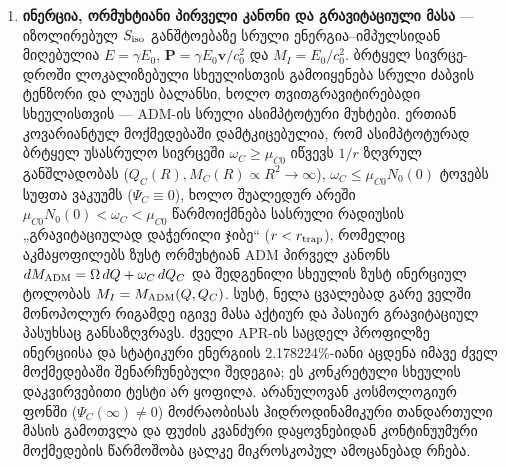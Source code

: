 \documentclass[11pt,a4paper]{article}
\begin{document}
\begin{enumerate}[label=\arabic*.]
სრული სტანდარტული PPN ვექტორი 1PN რიგამდე მიიღება მაშინ, როდესაც სრული მოქმედება შედგება აინშტაინ–ჰილბერტის ოპერატორისა და იმავე მეტრიკასთან უნივერსალურად და მინიმალურად დაკავშირებული მატერიის მოქმედებისგან, წყარო ერთი სრული შენახვადი ენერგია–იმპულსის ტენზორით აღირიცხება, RefG და GR ერთსა და იმავე ლოკალურ წყაროს, PPN ყალიბს, ფონსა და სასაზღვრო პირობებს იყენებს და დამატებითი დაუთრგუნავი ველი ან ოპერატორი ამ რიგში არ მონაწილეობს: $\gamma=\beta=1$ და $\xi=\alpha_1=\alpha_2=\alpha_3=\zeta_1=\zeta_2=\zeta_3=\zeta_4=0$. შედეგის მოქმედების არეა იზოლირებული, სუსტი, ნელა მოძრავი და სუსტად თვითგრავიტირებადი წყაროები.

ამასთან, დისკრეტული 3D კვანძური გრაფიდან $\Gamma = \mathbb{Z}^3$ უწყვეტ $3+1$ კოფრეიმზე $e^A{}_\mu$ გადასვლა, ლოკალური $\mathrm{SO}(1,3)$ ორიენტაციის ყალიბური ინვარიანტობით TEGR კოეფიციენტების $(c_1, c_2, c_3) = (\frac{1}{4}, \frac{1}{2}, -1)$ ცალსახა ფიქსაცია, კენტრიგოვანი LIV-ის იგივური გაბათილება ($\delta_1^{\rm LIV}\equiv 0$), სილი–დევიტის სითბური ბირთვით $\ell_* = 2\sqrt{\pi}\,\ell_{\rm Pl}$-ისა და მაღალი სიმრუდის $R^2$ წევრების $(\ell_*/r_c)^2 = 8.46\times 10^{-76}$ დათრგუნვის გამოყვანა, და 2-მარყუჟიანი ინსტანტონური ქმედებით $S_{\rm inst}^{\rm RefG} = 51.527842$ ნიუტონის მუდმივის $G_{\rm RefG} = 6.674268\times 10^{-11}\text{ მ}^3\,\text{კგ}^{-1}\,\text{წმ}^{-2}$ ($-0.21\sigma$) და დეფორმაციის მასშტაბის $M_* c_0^2 = 0.6874\text{ meV}$ გამოთვლა კეტავს დისკრეტულ–უწყვეტ გრავიტაციულ ხიდს. შემდგომ მიკროსკოპულ ამოცანად რჩება $\Lambda_F$-ის დინამიკური რელაქსაციის სრული არაპერტურბაციული გამოყვანა.
\item \textbf{ინერცია, ორმუხტიანი პირველი კანონი და გრავიტაციული მასა} — იზოლირებულ $S_{\rm iso}$ განშტოებაზე სრული ენერგია–იმპულსიდან მიღებულია $E=\gamma E_0$, $\mathbf P=\gamma E_0\mathbf v/c_0^2$ და $M_I=E_0/c_0^2$. ბრტყელ სივრცე-დროში ლოკალიზებული სხეულისთვის გამოიყენება სრული ძაბვის ტენზორი და ლაუეს ბალანსი, ხოლო თვითგრავიტირებადი სხეულისთვის — ADM-ის სრული ასიმპტოტური მუხტები. ერთიან კოვარიანტულ მოქმედებაში დამტკიცებულია, რომ ასიმპტოტურად ბრტყელ უსასრულო სივრცეში $\omega_C \ge \mu_{C0}$ იწვევს $1/r$ ზღვრულ განშლადობას ($Q_C(R), M_C(R) \propto R^2 \to \infty$), $\omega_C \le \mu_{C0} N_0(0)$ ტოვებს სუფთა ვაკუუმს ($\Psi_C \equiv 0$), ხოლო შუალედურ არეში $\mu_{C0} N_0(0) < \omega_C < \mu_{C0}$ წარმოიქმნება სასრული რადიუსის „გრავიტაციულად დაჭერილი ჯიბე“ ($r < r_{\rm trap}$), რომელიც აკმაყოფილებს ზუსტ ორმუხტიან ADM პირველ კანონს $dM_{\rm ADM} = \Omega\,dQ + \omega_C\,dQ_C$ და შედგენილი სხეულის ზუსტ ინერციულ ტოლობას $M_I = M_{\rm ADM}(Q, Q_C)$. სუსტ, ნელა ცვალებად გარე ველში მონოპოლურ რიგამდე იგივე მასა აქტიურ და პასიურ გრავიტაციულ პასუხსაც განსაზღვრავს. ძველი APR-ის საცდელ პროფილზე ინერციისა და სტატიკური ენერგიის 2.178224\%-იანი აცდენა იმავე ძველ მოქმედებაში შენარჩუნებული შედეგია; ეს კონკრეტული სხეულის დაკვირვებითი ტესტი არ ყოფილა. არანულოვან კოსმოლოგიურ ფონში ($\Psi_C(\infty)\neq 0$) მოძრაობისას ჰიდროდინამიკური თანდართული მასის გამოთვლა და ფუძის კვანძური დაყოვნებიდან კონტინუუმური მოქმედების წარმოშობა ცალკე მიკროსკოპულ ამოცანებად რჩება.

\end{enumerate}
\end{document}

